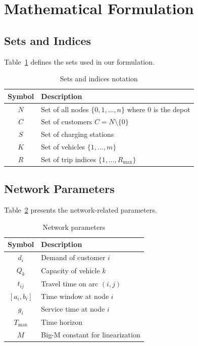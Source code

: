 \documentclass[11pt,a4paper]{article}
\begin{document}
\section{Mathematical Formulation}

\subsection{Sets and Indices}

Table~\ref{tab:sets} defines the sets used in our formulation.

\begin{table}[H]
\centering
\caption{Sets and indices notation}
\label{tab:sets}
\begin{tabular}{@{}cl@{}}
\toprule
\textbf{Symbol} & \textbf{Description} \\
\midrule
$N$ & Set of all nodes $\{0, 1, \ldots, n\}$ where $0$ is the depot \\
$C$ & Set of customers $C = N \setminus \{0\}$ \\
$S$ & Set of charging stations \\
$K$ & Set of vehicles $\{1, \ldots, m\}$ \\
$R$ & Set of trip indices $\{1, \ldots, R_{\max}\}$ \\
\bottomrule
\end{tabular}
\end{table}

\subsection{Network Parameters}

Table~\ref{tab:network_params} presents the network-related parameters.

\begin{table}[H]
\centering
\caption{Network parameters}
\label{tab:network_params}
\begin{tabular}{@{}cl@{}}
\toprule
\textbf{Symbol} & \textbf{Description} \\
\midrule
$d_i$ & Demand of customer $i$ \\
$Q_k$ & Capacity of vehicle $k$ \\
$t_{ij}$ & Travel time on arc $(i, j)$ \\
$[a_i, b_i]$ & Time window at node $i$ \\
$g_i$ & Service time at node $i$ \\
$T_{\max}$ & Time horizon \\
$M$ & Big-M constant for linearization \\
\bottomrule
\end{tabular}
\end{table}
\end{document}
